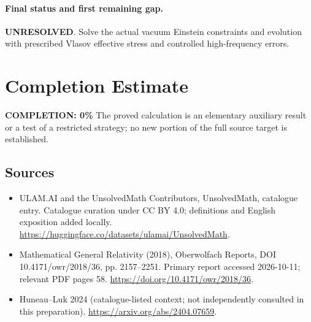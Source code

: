 \documentclass[11pt]{article}
\begin{document}
\paragraph{Final status and first remaining gap.}
\textbf{UNRESOLVED}. Solve the actual vacuum Einstein constraints and evolution with prescribed Vlasov effective stress and controlled high-frequency errors.

\section{Completion Estimate}
\noindent\textbf{COMPLETION: 0\%}
The proved calculation is an elementary auxiliary result or a test of a restricted strategy; no new portion of the full source target is established.

\subsection{Sources}
\begin{itemize}
\item[\hypertarget{source:statement:1}{S1}] ULAM.AI and the UnsolvedMath Contributors, UnsolvedMath, catalogue entry. Catalogue curation under CC BY 4.0; definitions and English exposition added locally.
\url{https://huggingface.co/datasets/ulamai/UnsolvedMath}.
\item[\hypertarget{source:statement:2}{S2}] Mathematical General Relativity (2018), Oberwolfach Reports, DOI 10.4171/owr/2018/36, pp. 2157--2251. Primary report accessed 2026-10-11; relevant PDF pages 58.
\url{https://doi.org/10.4171/owr/2018/36}.
\item[\hypertarget{source:statement:3}{S3}] Huneau--Luk 2024 (catalogue-listed context; not independently consulted in this preparation).
\url{https://arxiv.org/abs/2404.07659}.
\end{itemize}
\label{end:statement}
\end{document}
